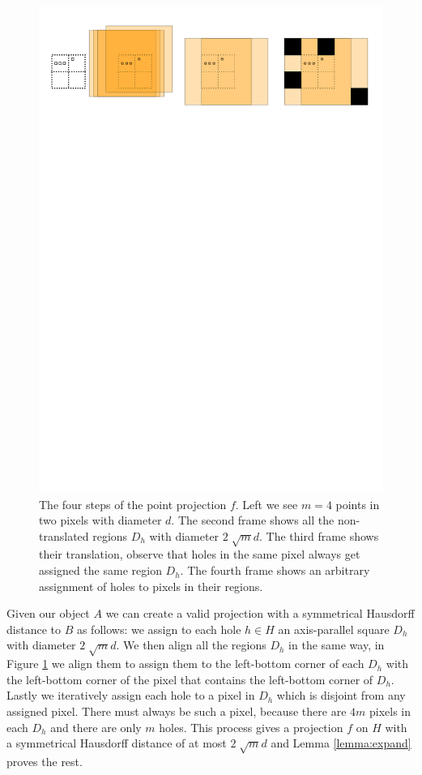 \documentclass[a4paper,UKenglish,cleveref]{lipics-v2019}
\begin{document}
\begin{figure}[H]
\centering
\includegraphics[width=\textwidth]{Figures/pointprojection.pdf}
\caption{The four steps of the point projection $f$. Left we see $m=4$ points in two pixels with diameter $d$. The second frame shows all the non-translated regions $D_h$ with diameter $2\sqrt[]{m}d$. The third frame shows their translation, observe that holes in the same pixel always get assigned the same region $D_h$. The fourth frame shows an arbitrary assignment of holes to pixels in their regions.}
\label{fig:pointprojection}
\end{figure}


Given our object $A$ we can create a valid projection with a symmetrical Hausdorff distance to $B$ as follows: we assign to each hole $h \in H$ an axis-parallel square $D_h$ with diameter $2\sqrt[]{m}d$. We then align all the regions $D_h$ in the same way, in Figure \ref{fig:pointprojection} we align them to assign them to the left-bottom corner of each $D_h$ with the left-bottom corner of the pixel that contains the left-bottom corner of $D_h$. Lastly we iteratively assign each hole to a pixel in $D_h$ which is disjoint from any assigned pixel. There must always be such a pixel, because there are $4m$ pixels in each $D_h$ and there are only $m$ holes. This process gives a projection $f$ on $H$ with a symmetrical Hausdorff distance of at most $2\sqrt[]{m}d$ and Lemma \ref{lemma:expand} proves the rest.
\end{document}
